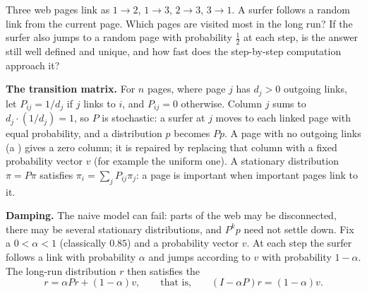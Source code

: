 \documentclass[10pt]{scrartcl}
\begin{document}
\begin{qbox}
  Three web pages link as $1\to2$, $1\to3$, $2\to3$, $3\to1$. A surfer follows a random link from the current page. Which pages are visited most in the long run? If the surfer also jumps to a random page with probability $\tfrac12$ at each step, is the answer still well defined and unique, and how fast does the step-by-step computation approach it?
\end{qbox}

\textbf{The transition matrix.} For $n$ pages, where page $j$ has $d_j>0$ outgoing links, let $P_{ij}=1/d_j$ if $j$ links to $i$, and $P_{ij}=0$ otherwise. Column $j$ sums to $d_j\cdot(1/d_j)=1$, so $P$ is stochastic: a surfer at $j$ moves to each linked page with equal probability, and a distribution $p$ becomes $Pp$. A page with no outgoing links (a ) gives a zero column; it is repaired by replacing that column with a fixed probability vector $v$ (for example the uniform one). A stationary distribution $\pi=P\pi$ satisfies $\pi_i=\sum_jP_{ij}\pi_j$: a page is important when important pages link to it.

\textbf{Damping.} The naive model can fail: parts of the web may be disconnected, there may be several stationary distributions, and $P^kp$ need not settle down. Fix a  $0<\alpha<1$ (classically $0.85$) and a probability vector $v$. At each step the surfer follows a link with probability $\alpha$ and jumps according to $v$ with probability $1-\alpha$. The long-run distribution $r$ then satisfies the 
\[
  r = \alpha Pr + (1-\alpha)v, \qquad\text{that is,}\qquad (I - \alpha P)r = (1-\alpha)v.
\]
\end{document}
